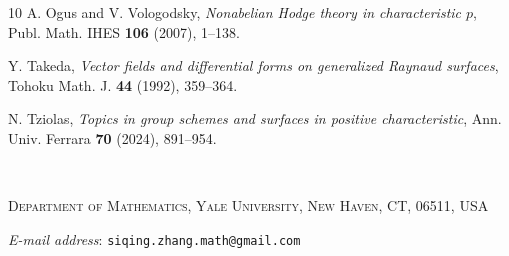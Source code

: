 \documentclass[11pt]{amsart}
\begin{document}
\begin{thebibliography}{10}
A. Ogus and V. Vologodsky,
\emph{Nonabelian Hodge theory in characteristic \(p\)},
Publ. Math. IHES \textbf{106} (2007), 1--138.



Y. Takeda,
\emph{Vector fields and differential forms on generalized Raynaud surfaces},
Tohoku Math. J. \textbf{44} (1992), 359--364.

N. Tziolas,
\emph{Topics in group schemes and surfaces in positive characteristic},
Ann. Univ. Ferrara \textbf{70} (2024), 891--954.

\end{thebibliography}

\;\\

\footnotesize{
 \textsc{Department of Mathematics, Yale University,  New Haven, CT, 06511,
USA}\par\nopagebreak
  \textit{E-mail address}: \texttt{siqing.zhang.math@gmail.com}}
\end{document}
